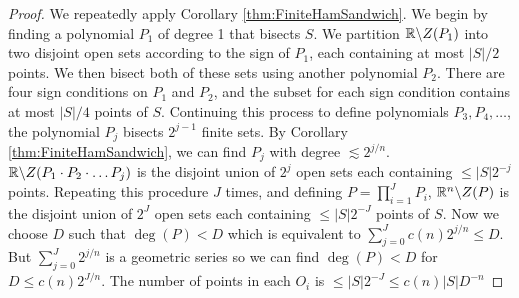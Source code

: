 \begin{proof}
We repeatedly apply Corollary \ref{thm:FiniteHamSandwich}. We begin by finding a polynomial $P_1$ of degree 1 that bisects $S$. We partition $\mathbb R \backslash Z(P_1)$
into two disjoint open sets according to the sign of $P_1$, each containing at most $|S|/2$ points. We then bisect both of these sets using another polynomial $P_2$. There are four sign conditions on $P_1$ and $P_2$, and the subset for
each sign condition contains at most $|S|/4$ points of $S$. Continuing this process to define polynomials $P_3, P_4, \dots$, the polynomial $P_j$ bisects $2^{j-1}$ finite sets. By Corollary \ref{thm:FiniteHamSandwich}, we can find $P_j$ with degree
$\lesssim 2^{j/n}$. $\mathbb R \backslash Z (P_1 \cdot P_2 \cdot \dots P_j)$ is the disjoint union of $2^j$ open sets each containing $\leq |S| 2^{-j}$ points. 
Repeating this procedure $J$ times, and defining $P = \prod_{i=1}^{J} P_i$, $\mathbb R^n \backslash Z(P)$ is the disjoint union of $2^J$ open sets each containing $ \leq |S|2^{-J}$
points of $S$. Now we choose $D$ such that $\deg(P) < D$ which is equivalent to $\sum_{j=0}^J c(n) 2^{j/n} \leq D$. But $\sum_{j=0}^J 2^{j/n}$ is a geometric series so we can find $\deg (P) < D$ for $D \leq c(n) 2^{J/n}$. 
The number of points in each $O_i$ is $\leq |S| 2^{-J} \leq c(n) |S| D^{-n}$
\end{proof}


